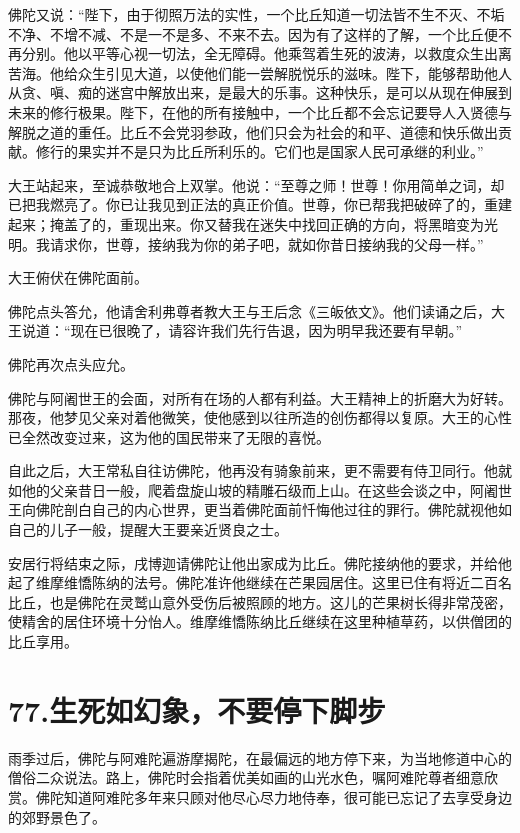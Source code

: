 \documentclass[12pt,twoside,openany]{book}
\begin{document}
佛陀又说：“陛下，由于彻照万法的实性，一个比丘知道一切法皆不生不灭、不垢不净、不增不减、不是一不是多、不来不去。因为有了这样的了解，一个比丘便不再分别。他以平等心视一切法，全无障碍。他乘驾着生死的波涛，以救度众生出离苦海。他给众生引见大道，以使他们能一尝解脱悦乐的滋味。陛下，能够帮助他人从贪、嗔、痴的迷宫中解放出来，是最大的乐事。这种快乐，是可以从现在伸展到未来的修行极果。陛下，在他的所有接触中，一个比丘都不会忘记要导人入贤德与解脱之道的重任。比丘不会党羽参政，他们只会为社会的和平、道德和快乐做出贡献。修行的果实并不是只为比丘所利乐的。它们也是国家人民可承继的利业。”

大王站起来，至诚恭敬地合上双掌。他说：“至尊之师！世尊！你用简单之词，却已把我燃亮了。你已让我见到正法的真正价值。世尊，你已帮我把破碎了的，重建起来；掩盖了的，重现出来。你又替我在迷失中找回正确的方向，将黑暗变为光明。我请求你，世尊，接纳我为你的弟子吧，就如你昔日接纳我的父母一样。”

大王俯伏在佛陀面前。

佛陀点头答允，他请舍利弗尊者教大王与王后念《三皈依文》。他们读诵之后，大王说道：“现在已很晚了，请容许我们先行告退，因为明早我还要有早朝。”

佛陀再次点头应允。

佛陀与阿阇世王的会面，对所有在场的人都有利益。大王精神上的折磨大为好转。那夜，他梦见父亲对着他微笑，使他感到以往所造的创伤都得以复原。大王的心性已全然改变过来，这为他的国民带来了无限的喜悦。

自此之后，大王常私自往访佛陀，他再没有骑象前来，更不需要有侍卫同行。他就如他的父亲昔日一般，爬着盘旋山坡的精雕石级而上山。在这些会谈之中，阿阇世王向佛陀剖白自己的内心世界，更当着佛陀面前忏悔他过往的罪行。佛陀就视他如自己的儿子一般，提醒大王要亲近贤良之士。

安居行将结束之际，戌博迦请佛陀让他出家成为比丘。佛陀接纳他的要求，并给他起了维摩维憍陈纳的法号。佛陀准许他继续在芒果园居住。这里已住有将近二百名比丘，也是佛陀在灵鹫山意外受伤后被照顾的地方。这儿的芒果树长得非常茂密，使精舍的居住环境十分怡人。维摩维憍陈纳比丘继续在这里种植草药，以供僧团的比丘享用。


\chapter{77.生死如幻象，不要停下脚步}\label{ch77}

雨季过后，佛陀与阿难陀遍游摩揭陀，在最偏远的地方停下来，为当地修道中心的僧俗二众说法。路上，佛陀时会指着优美如画的山光水色，嘱阿难陀尊者细意欣赏。佛陀知道阿难陀多年来只顾对他尽心尽力地侍奉，很可能已忘记了去享受身边的郊野景色了。
\end{document}
